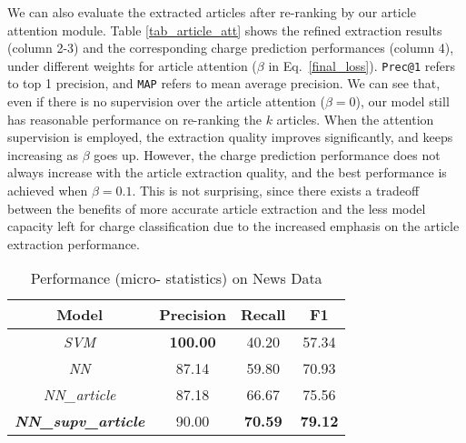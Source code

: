 We can also evaluate the extracted articles after re-ranking by our article attention module.
Table \ref{tab_article_att} shows the refined extraction results  (column 2-3) and the corresponding charge prediction performances (column 4), under different weights for article attention ($\beta$ in Eq.~\ref{final_loss}). \texttt{Prec@1} refers to top 1 precision, and \texttt{MAP} refers to mean average precision.
%
We can see that, even if there is no supervision over the article attention ($\beta=0$), our model still has reasonable performance on re-ranking the $k$ articles. When the attention supervision is employed, the extraction quality improves significantly, and keeps increasing as $\beta$ goes up.
However, the charge prediction performance does not always increase with the article extraction quality, and the best performance is achieved when $\beta=0.1$. This is not surprising, since  there exists a tradeoff between the benefits of more accurate article extraction and the less model capacity left for charge classification due to the increased emphasis on the article extraction performance.

\begin{table}
\centering
\small{
\begin{tabular}{|c|c|c|c|}
\hline
\textbf{Model}												& \textbf{Precision} 				& \textbf{Recall} 				& \textbf{F1} 	\\
\hline
\textit{SVM} 													& \textbf{100.00}						& 40.20  									& 57.34 				 	\\
\hline
\textit{NN}														& 87.14											& 59.80 									& 70.93					\\
\hline
\textit{NN\_article}					& 87.18											& 66.67 									& 75.56					\\
\hline
\textbf{\textit{NN\_supv\_article}} 	& 90.00 										& \textbf{70.59} 					& \textbf{79.12} 		 	\\
\hline
\end{tabular}
}
\caption{Performance (micro- statistics) on News Data}
\label{tabble_news_results}
\vspace{-0.5em}
\end{table}

